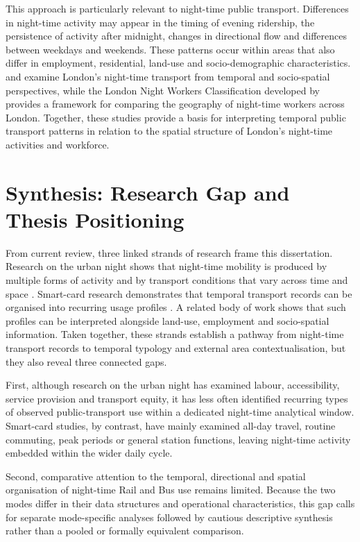 This approach is particularly relevant to night-time public transport. Differences in night-time activity may appear in the timing of evening ridership, the persistence of activity after midnight, changes in directional flow and differences between weekdays and weekends. These patterns occur within areas that also differ in employment, residential, land-use and socio-demographic characteristics. \citet{McArthur2019} and \citet{Smeds2020} examine London's night-time transport from temporal and socio-spatial perspectives, while the London Night Workers Classification developed by \citet{Mavrogeni2025} provides a framework for comparing the geography of night-time workers across London. Together, these studies provide a basis for interpreting temporal public transport patterns in relation to the spatial structure of London's night-time activities and workforce.

\section{Synthesis: Research Gap and Thesis Positioning}

From current review, three linked strands of research frame this dissertation. Research on the urban night shows that night-time mobility is produced by multiple forms of activity and by transport conditions that vary across time and space \citep{Schwanen2012,VanLiempt2015,Shaw2022}. Smart-card research demonstrates that temporal transport records can be organised into recurring usage profiles \citep{Briand2016,ElMahrsi2017,Gan2020}. A related body of work shows that such profiles can be interpreted alongside land-use, employment and socio-spatial information. Taken together, these strands establish a pathway from night-time transport records to temporal typology and external area contextualisation, but they also reveal three connected gaps.

First, although research on the urban night has examined labour, accessibility, service provision and transport equity, it has less often identified recurring types of observed public-transport use within a dedicated night-time analytical window. Smart-card studies, by contrast, have mainly examined all-day travel, routine commuting, peak periods or general station functions, leaving night-time activity embedded within the wider daily cycle.

Second, comparative attention to the temporal, directional and spatial organisation of night-time Rail and Bus use remains limited. Because the two modes differ in their data structures and operational characteristics, this gap calls for separate mode-specific analyses followed by cautious descriptive synthesis rather than a pooled or formally equivalent comparison.

